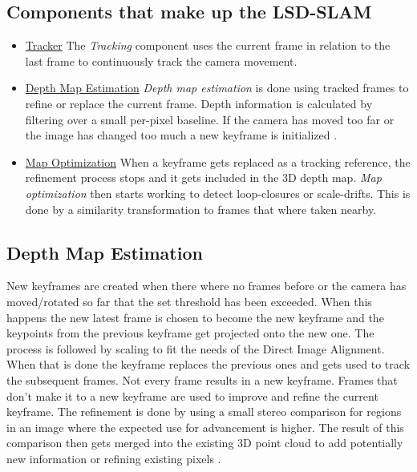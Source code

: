 \subsection{Components that make up the LSD-SLAM}
\begin{itemize}
    \item \underline{Tracker} \newline
        The \textit{Tracking} component uses the current frame in relation to the last frame to continuously track the camera movement.
    \item \underline{Depth Map Estimation} \newline
        \textit{Depth map estimation} is done using tracked frames to refine or replace the current frame. Depth information is calculated by filtering over a small per-pixel baseline. If the camera has moved too far or the image has changed too much a new keyframe is initialized \cite{lsdslam_eccv}.
    \item \underline{Map Optimization} \newline
        When a keyframe gets replaced as a tracking reference, the refinement process stops and it gets included in the 3D depth map. \textit{Map optimization} then starts working to detect loop-closures or scale-drifts. This is done by a similarity transformation to frames that where taken nearby.
\end{itemize}

\subsection{Depth Map Estimation}
New keyframes are created when there where no frames before or the camera has moved/rotated so far that the set threshold has been exceeded. When this happens the new latest frame is chosen to become the new keyframe and the keypoints from the previous keyframe get projected onto the new one. The process is followed by scaling to fit the needs of the Direct Image Alignment. When that is done the keyframe replaces the previous ones and gets used to track the subsequent frames.\newline
Not every frame results in a new keyframe. Frames that don't make it to a new keyframe are used to improve and refine the current keyframe. The refinement is done by using a small stereo comparison for regions in an image where the expected use for advancement is higher. The result of this comparison then gets merged into the existing 3D point cloud to add potentially new information or refining existing pixels \cite{lsdslam_eccv}.

